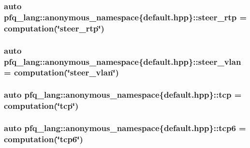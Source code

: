 \hypertarget{namespacepfq__lang_1_1anonymous__namespace_02default_8hpp_03_a16b18fdc10f8dd8c0974d9f0d6c13af9}{
\subsubsection[{steer\-\_\-rtp}]{\setlength{\rightskip}{0pt plus 5cm}auto pfq\-\_\-lang\-::anonymous\-\_\-namespace\{default.\-hpp\}\-::steer\-\_\-rtp = {\bf computation}(\char`\"{}steer\-\_\-rtp\char`\"{})}}\label{namespacepfq__lang_1_1anonymous__namespace_02default_8hpp_03_a16b18fdc10f8dd8c0974d9f0d6c13af9}
\hypertarget{namespacepfq__lang_1_1anonymous__namespace_02default_8hpp_03_ad32804252244d5b572b9f5fe0cdda675}{
\subsubsection[{steer\-\_\-vlan}]{\setlength{\rightskip}{0pt plus 5cm}auto pfq\-\_\-lang\-::anonymous\-\_\-namespace\{default.\-hpp\}\-::steer\-\_\-vlan = {\bf computation}(\char`\"{}steer\-\_\-vlan\char`\"{})}}\label{namespacepfq__lang_1_1anonymous__namespace_02default_8hpp_03_ad32804252244d5b572b9f5fe0cdda675}
\hypertarget{namespacepfq__lang_1_1anonymous__namespace_02default_8hpp_03_a4046140746c0012b4d1ea8d3ef53f084}{
\subsubsection[{tcp}]{\setlength{\rightskip}{0pt plus 5cm}auto pfq\-\_\-lang\-::anonymous\-\_\-namespace\{default.\-hpp\}\-::tcp = {\bf computation}(\char`\"{}tcp\char`\"{})}}\label{namespacepfq__lang_1_1anonymous__namespace_02default_8hpp_03_a4046140746c0012b4d1ea8d3ef53f084}
\hypertarget{namespacepfq__lang_1_1anonymous__namespace_02default_8hpp_03_a734af11014e5ccaef77d6fa39cea0d6b}{
\subsubsection[{tcp6}]{\setlength{\rightskip}{0pt plus 5cm}auto pfq\-\_\-lang\-::anonymous\-\_\-namespace\{default.\-hpp\}\-::tcp6 = {\bf computation}(\char`\"{}tcp6\char`\"{})}}\label{namespacepfq__lang_1_1anonymous__namespace_02default_8hpp_03_a734af11014e5ccaef77d6fa39cea0d6b}
